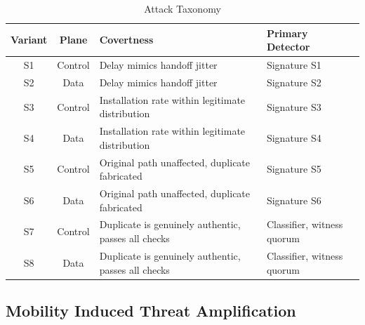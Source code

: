 \documentclass[lettersize,journal]{IEEEtran}
\theoremstyle{plain}
\theoremstyle{remark}
\begin{document}
	\begin{table}[!t]
		\centering
		\caption{Attack Taxonomy}
		\label{tab:taxonomy}
		\renewcommand{\arraystretch}{1.2}
		\footnotesize
		\begin{tabular}{|c|c|>{\raggedright\arraybackslash}p{2.7cm}|>{\raggedright\arraybackslash}p{2.3cm}|}
			\hline
			\textbf{Variant} & \textbf{Plane} & \textbf{Covertness} & \textbf{Primary Detector} \\
			\hline
			S1 & Control & Delay mimics handoff jitter & Signature S1 \\
			\hline
			S2 & Data & Delay mimics handoff jitter & Signature S2 \\
			\hline
			S3 & Control & Installation rate within legitimate distribution & Signature S3 \\
			\hline
			S4 & Data & Installation rate within legitimate distribution & Signature S4 \\
			\hline
			S5 & Control & Original path unaffected, duplicate fabricated & Signature S5 \\
			\hline
			S6 & Data & Original path unaffected, duplicate fabricated & Signature S6 \\
			\hline
			S7 & Control & Duplicate is genuinely authentic, passes all checks & Classifier, witness quorum \\
			\hline
			S8 & Data & Duplicate is genuinely authentic, passes all checks & Classifier, witness quorum \\
			\hline
		\end{tabular}
	\end{table}
	
	\subsection{Mobility Induced Threat Amplification}\label{subsec:mobility_amplification}
	
\end{document}
